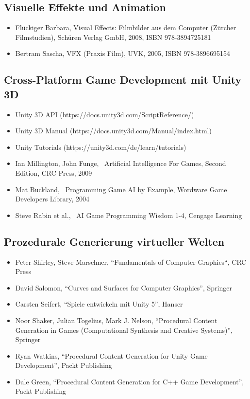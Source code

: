 \subsection{Visuelle Effekte und
Animation}\label{visuelle-effekte-und-animation-3}

\begin{itemize}
\tightlist
\item
  Flückiger Barbara, Visual Effects: Filmbilder aus dem Computer
  (Zürcher Filmstudien), Schüren Verlag GmbH, 2008, ISBN 978-3894725181
\item
  Bertram Sascha, VFX (Praxis Film), UVK, 2005, ISBN 978-3896695154
\end{itemize}

\subsection{Cross-Platform Game Development mit Unity
3D}\label{cross-platform-game-development-mit-unity-3d-3}

\begin{itemize}
\tightlist
\item
  Unity 3D API (https://docs.unity3d.com/ScriptReference/)
\item
  Unity 3D Manual (https://docs.unity3d.com/Manual/index.html)
\item
  Unity Tutorials (https://unity3d.com/de/learn/tutorials)
\item
  Ian Millington, John Funge,~ Artificial Intelligence For Games, Second
  Edition, CRC Press, 2009
\item
  Mat Buckland,~ Programming Game AI by Example, Wordware Game
  Developers Library, 2004
\item
  Steve Rabin et al.,~ AI Game Programming Wisdom 1-4, Cengage Learning
\end{itemize}

\subsection{Prozedurale Generierung virtueller
Welten}\label{prozedurale-generierung-virtueller-welten-3}

\begin{itemize}
\tightlist
\item
  Peter Shirley, Steve Marschner, ``Fundamentals of Computer Graphics``,
  CRC Press
\item
  David Salomon, ``Curves and Surfaces for Computer Graphics'', Springer
\item
  Carsten Seifert, ``Spiele entwickeln mit Unity 5'', Hanser
\item
  Noor Shaker, Julian Togelius, Mark J. Nelson, ``Procedural Content
  Generation in Games (Computational Synthesis and Creative Systems)'',
  Springer
\item
  Ryan Watkins, ``Procedural Content Generation for Unity Game
  Development'', Packt Publishing
\item
  Dale Green, ``Procedural Content Generation for C++ Game
  Development'', Packt Publishing
\end{itemize}

